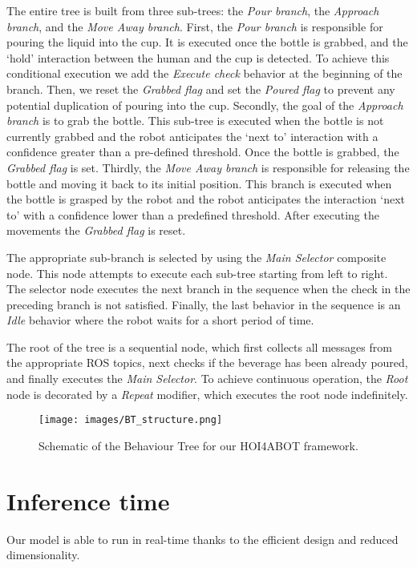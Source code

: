 \documentclass{article}
\begin{document}
The entire tree is built from three sub-trees: the \textit{Pour branch}, the \textit{Approach branch}, and the \textit{Move Away branch}. First, the \textit{Pour branch} is responsible for pouring the liquid into the cup. It is executed once the bottle is grabbed, and the `hold' interaction between the human and the cup is detected. To achieve this conditional execution we add the \textit{Execute check} behavior at the beginning of the branch. Then, we reset the \textit{Grabbed flag} and set the \textit{Poured flag} to prevent any potential duplication of pouring into the cup. Secondly, the goal of the \textit{Approach branch} is to grab the bottle. This sub-tree is executed when the bottle is not currently grabbed and the robot anticipates the `next to' interaction with a confidence greater than a pre-defined threshold. Once the bottle is grabbed, the \textit{Grabbed flag} is set. Thirdly, the \textit{Move Away branch} is responsible for releasing the bottle and moving it back to its initial position. This branch is executed when the bottle is grasped by the robot and the robot anticipates the interaction `next to'  with a confidence lower than a predefined threshold. After executing the movements the \textit{Grabbed flag} is reset.

The appropriate sub-branch is selected by using the \textit{Main Selector} composite node. This node attempts to execute each sub-tree starting from left to right. The selector node executes the next branch in the sequence when the check in the preceding branch is not satisfied. Finally, the last behavior in the sequence is an \textit{Idle} behavior where the robot waits for a short period of time.

The root of the tree is a sequential node, which first collects all messages from the appropriate ROS topics, next checks if the beverage has been already poured, and finally executes the \textit{Main Selector}. To achieve continuous operation, the \textit{Root} node is decorated by a \textit{Repeat} modifier, which executes the root node indefinitely.

\begin{figure}[t]
    \centering
    \texttt{[image: images/BT\_structure.png]}
    \caption{Schematic of the Behaviour Tree for our HOI4ABOT framework. }
    \label{fig:BT}
\end{figure}

\section{Inference time} \label{apx:inference}
Our model is able to run in real-time thanks to the efficient design and reduced dimensionality. 
\end{document}
